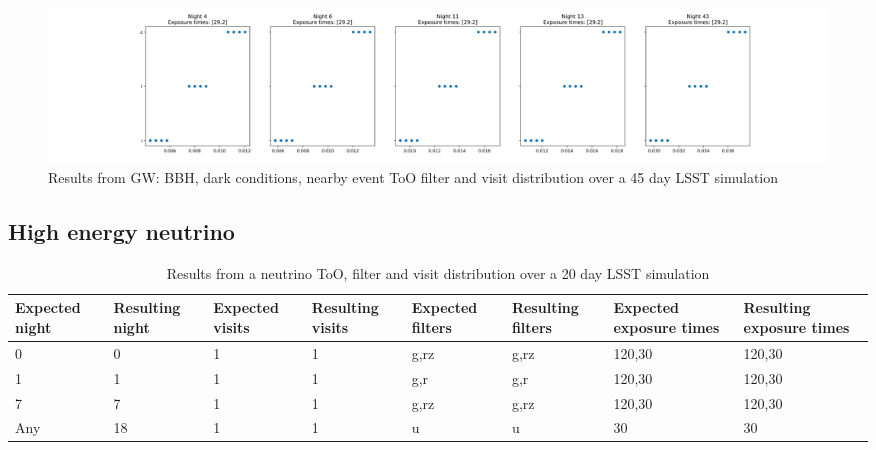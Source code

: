 \begin{figure}[h!]
    \centering
    \includegraphics[width=\linewidth]{figures/validationTests/SVRequired/BBHBrightFilterPlot.png}
    \caption{Results from GW: BBH, dark conditions, nearby event ToO filter and visit distribution over a 45 day LSST simulation}
    \label{fig:GWBrightFilterResult}
\end{figure}
\clearpage

\subsection{High energy neutrino}

\begin{table}[h!]
\centering
\begin{adjustbox}{max width=\textwidth}
\begin{tabular}{|l|l|l|l|l|l|l|l|}
\hline
Expected night & Resulting night & Expected visits & Resulting visits & Expected filters & Resulting filters & Expected exposure times & Resulting exposure times \\ \hline
0              & 0               & 1               & 1                & g,rz             & g,rz              & 120,30                  & 120,30                   \\ \hline
1              & 1               & 1               & 1                & g,r              & g,r               & 120,30                  & 120,30                   \\ \hline
7              & 7               & 1               & 1                & g,rz             & g,rz              & 120,30                  & 120,30                   \\ \hline
Any            & 18              & 1               & 1                & u                & u                 & 30                      & 30                       \\ \hline
\end{tabular}
\end{adjustbox}
\caption{Results from a neutrino ToO, filter and visit distribution over a 20 day LSST simulation}
\label{tab:HENeutrinoResult}
\end{table}



